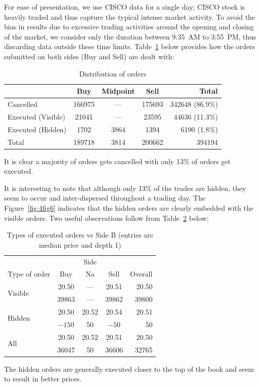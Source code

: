 For ease of presentation, we use CISCO data for a single day; CISCO stock is heavily traded and thus capture the typical intense market activity. To avoid the bias in results due to excessive trading activities around the opening and closing of the market, we consider only the duration between 9:35~AM to 3:55~PM, thus discarding data outside these time limits. Table~\ref{tab:distributionoforder} below provides how the orders submitted on both sides (Buy and Sell) are dealt with:
	\begin{table}[!ht]
	\centering
	\caption{Distribution of orders \label{tab:distributionoforder}}
	\begin{tabular}{l | ccc | r}
	& Buy & Midpoint & Sell & Total \\ \hline
	Cancelled & 166975 & --- & 175693 & 342648 (86.9\%) \\
	Executed (Visible) & 21041 & --- & 23595 & 44636 (11.3\%) \\
	Executed (Hidden) & 1702 & 3864 & 1394 & 6190 (1.8\%) \\ \hline
	Total & 189718 & 3814 & 200662 & 394194
	\end{tabular}
	\end{table}
It is clear a majority of orders gets cancelled with only 13\% of orders get executed. 


It is interesting to note that although only 13\% of the trades are hidden, they seem to occur and inter-dispersed throughout a trading day. The Figure~\ref{fig:4fig6} indicates that the hidden orders are clearly embedded with the visible orders. Two useful observations follow from Table~\ref{tab:typeexecuted} below;
	\begin{table}[!ht]
	\centering
	\caption{Types of executed orders vs Side B (entries are median price and depth 1) \label{tab:typeexecuted}}
	\begin{tabular}{l|ccc|r}
	& \multicolumn{3}{c|}{Side} & \\
	Type of order & Buy & Na & Sell & Overall \\ \hline 
	\multirow{2}{*}{Visible} & 20.50 & --- & 20.51 & 20.50 \\
	 & 39863 & --- & 39862 & 39800 \\
	\multirow{2}{*}{Hidden} & 20.50 & 20.52 & 20.54 & 20.51 \\
	 & $-150$ & 50 & $-50$ & 50 \\ \hline
	\multirow{2}{*}{All} & 20.50 & 20.52 & 20.51 & 20.50 \\
	 & 36047 & 50 & 36606 & 32765
	\end{tabular}
	\end{table}
The hidden orders are generally executed closer to the top of the book and seem to result in better prices. 



